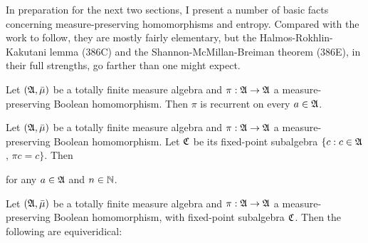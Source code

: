      
\def\barln{\mathop{\bar{\text{ln}}}}
     
\def\chaptername{Automorphisms}
\def\sectionname{More about entropy}
     
     
In preparation for the next two sections, I present a number of basic
facts concerning measure-preserving homomorphisms and entropy.
Compared with the work to follow, they are mostly fairly elementary, but
the Halmos-Rokhlin-Kakutani lemma (386C) and the
Shannon-McMillan-Breiman
theorem (386E), in their full strengths, go farther than one might
expect.
     
 Let $(\frak A,\bar\mu)$ be a totally finite
measure algebra and $\pi:\frak A\to\frak A$ a measure-preserving
Boolean homomorphism.   Then $\pi$ is recurrent on every $a\in\frak A$.
     
     
Let $(\frak A,\bar\mu)$ be a totally finite measure algebra and
$\pi:\frak A\to\frak A$ a measure-preserving Boolean homomorphism.   Let
$\frak C$ be its fixed-point subalgebra $\{c:c\in\frak A$, $\pi c=c\}$.
Then
     
     
\noindent for any $a\in\frak A$ and $n\in\Bbb N$.
     
     
 Let %
$(\frak A,\bar\mu)$
be a totally finite measure algebra and $\pi:\frak A\to\frak A$ a
measure-preserving Boolean homomorphism, with fixed-point subalgebra
$\frak C$.   Then the following are equiveridical:
     
